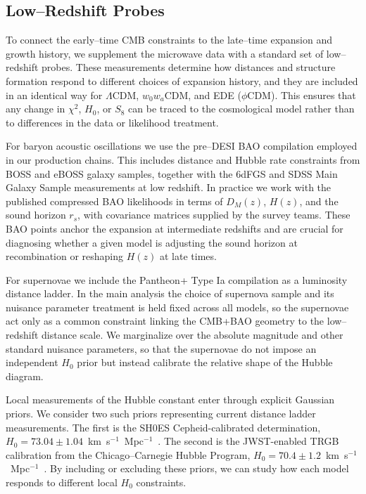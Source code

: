 \documentclass[a4paper,11pt]{article}
\begin{document}
\subsection{Low--Redshift Probes}
\label{sec:lowz}

To connect the early--time CMB constraints to the late--time expansion and growth history, we supplement the microwave data with a standard set of low--redshift probes. These measurements determine how distances and structure formation respond to different choices of expansion history, and they are included in an identical way for $\Lambda$CDM, $w_0 w_a$CDM, and EDE ($\phi$CDM). This ensures that any change in $\chi^2$, $H_0$, or $S_8$ can be traced to the cosmological model rather than to differences in the data or likelihood treatment.

For baryon acoustic oscillations we use the pre--DESI BAO compilation employed in our production chains. This includes distance and Hubble rate constraints from BOSS and eBOSS galaxy samples, together with the 6dFGS and SDSS Main Galaxy Sample measurements at low redshift. In practice we work with the published compressed BAO likelihoods in terms of $D_M(z)$, $H(z)$, and the sound horizon $r_s$, with covariance matrices supplied by the survey teams. These BAO points anchor the expansion at intermediate redshifts and are crucial for diagnosing whether a given model is adjusting the sound horizon at recombination or reshaping $H(z)$ at late times.

For supernovae we include the Pantheon+ Type Ia compilation as a luminosity distance ladder. In the main analysis the choice of supernova sample and its nuisance parameter treatment is held fixed across all models, so the supernovae act only as a common constraint linking the CMB+BAO geometry to the low--redshift distance scale. We marginalize over the absolute magnitude and other standard nuisance parameters, so that the supernovae do not impose an independent $H_0$ prior but instead calibrate the relative shape of the Hubble diagram.

Local measurements of the Hubble constant enter through explicit Gaussian priors. We consider two such priors representing current distance ladder measurements. The first is the SH0ES Cepheid-calibrated determination, $H_0 = 73.04 \pm 1.04$~km~s$^{-1}$~Mpc$^{-1}$~\cite{SH0ES}. The second is the JWST-enabled TRGB calibration from the Chicago--Carnegie Hubble Program, $H_0 = 70.4 \pm 1.2$~km~s$^{-1}$~Mpc$^{-1}$~\cite{Freedman2024}. By including or excluding these priors, we can study how each model responds to different local $H_0$ constraints.
\end{document}
